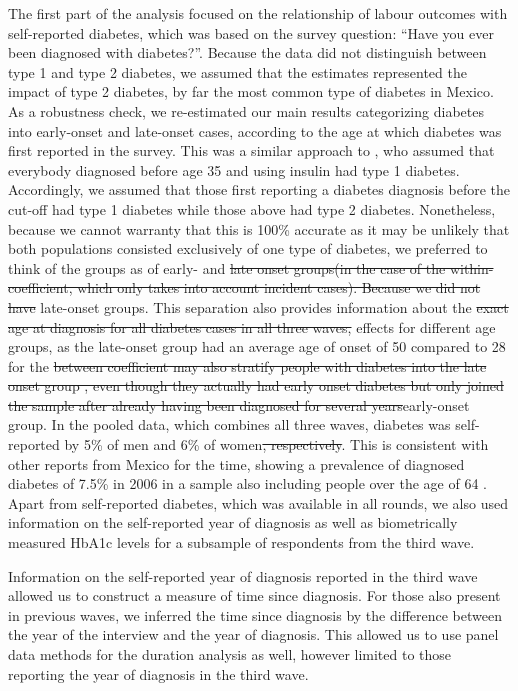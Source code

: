 \documentclass[12pt,english]{article}
\providecommand{\DIFaddtex}[1]{{\protect\color{blue}#1}} %
\providecommand{\DIFdeltex}[1]{{\protect\color{red}\sout{#1}}}                      %
\providecommand{\DIFaddbegin}{} %
\providecommand{\DIFaddend}{} %
\providecommand{\DIFdelbegin}{} %
\providecommand{\DIFdelend}{} %
\providecommand{\DIFadd}[1]{\texorpdfstring{\DIFaddtex{#1}}{#1}} %
\providecommand{\DIFdel}[1]{\texorpdfstring{\DIFdeltex{#1}}{}} %
\begin{document}
The first part of the analysis focused on the relationship of labour outcomes with self-reported diabetes, which was based on the survey question: “Have you ever been diagnosed with diabetes?”. Because the data did not distinguish between type 1 and type 2 diabetes, we assumed that the estimates represented the impact of type 2 diabetes, by far the most common type of diabetes in Mexico. As a robustness check, we re-estimated our main results categorizing diabetes into early-onset and late-onset cases, according to the age at which diabetes was first reported in the survey. This was a similar approach to \textcite{Alegre-Diaz2016}, who assumed that everybody diagnosed before age 35 and using insulin had type 1 diabetes. Accordingly, we assumed that those first reporting a diabetes diagnosis before the cut-off had type 1 diabetes while those above had type 2 diabetes. Nonetheless, because we cannot warranty that this is 100\% accurate as it may be unlikely that both populations consisted exclusively of one type of diabetes, we preferred to think of the groups as of early- and \DIFdelbegin \DIFdel{late onset groups(in the case of the within-coefficient, which only takes into account incident cases). Because we did not have }\DIFdelend \DIFaddbegin \DIFadd{late-onset groups. This separation also provides }\DIFaddend information about the \DIFdelbegin \DIFdel{exact age at diagnosis for all diabetes cases in all three waves, }\DIFdelend \DIFaddbegin \DIFadd{effects for different age groups, as the late-onset group had an average age of onset of 50 compared to 28 for }\DIFaddend the \DIFdelbegin \DIFdel{between coefficient may also stratify people with diabetes into the late onset group , even though they actually had early onset diabetes but only joined the sample after already having been diagnosed for several years}\DIFdelend \DIFaddbegin \DIFadd{early-onset group}\DIFaddend . In the pooled data, which combines all three waves, diabetes was self-reported by 5\% of men and 6\% of women\DIFdelbegin \DIFdel{, respectively}\DIFdelend . This is consistent with other reports from Mexico for the time, showing a prevalence of diagnosed diabetes of 7.5\% in 2006 in a sample also including people over the age of 64 \parencite{Barquera2013}. Apart from self-reported diabetes, which was available in all rounds, we also used information on the self-reported year of diagnosis as well as biometrically measured \ac{HbA1c} levels for a subsample of respondents from the third wave.


Information on the self-reported year of diagnosis reported in the third wave allowed us to construct a measure of time since diagnosis. For those also present in previous waves, we inferred the time since diagnosis by the difference between the year of the interview and the year of diagnosis. This allowed us to use panel data methods for the duration analysis as well, however limited to those reporting the year of diagnosis in the third wave. 
\end{document}
